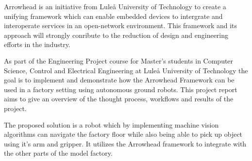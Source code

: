 Arrowhead is an initiative from Luleå University of Technology to create a unifying framework which can enable embedded devices to intergrate and interoperate services in an open-network environment. This framework and its approach will strongly conribute to the reduction of design and engineering efforts in the industry. 

As part of the Engineering Project course for Master's students in Computer Science, Control and Electrical Engineering at Luleå University of Technology the goal is to implement and demonstrate how the Arrowhead Framework can be used in a factory setting using autonomous ground robots. This project report aims to give an overview of the thought process, workflows and results of the project. 

The proposed solution is a robot which by implementing machine vision algorithms can navigate the factory floor while also being able to pick up object using it's arm and gripper. It utilizes the Arrowhead framework to integrate with the other parts of the model factory. 

